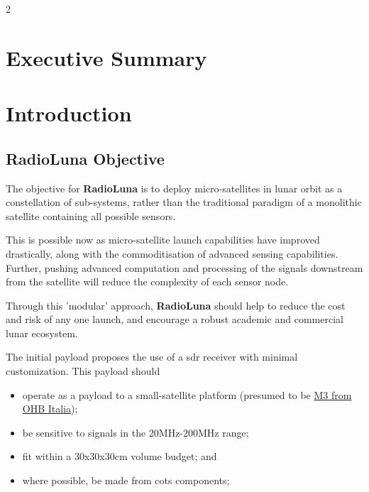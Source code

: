 \documentclass[
	a4paper, %
]{ChaosEngineReport}
\begin{document}
\begin{multicols}{2} %


\tableofcontents %


\section{Executive Summary} %

\lipsum[3]

\newpage

\section {Introduction}
\subsection{RadioLuna Objective}
The objective for \textbf{RadioLuna} is to deploy micro-satellites in lunar orbit as a constellation of sub-systems, rather than the traditional paradigm of a monolithic satellite containing all possible sensors.

This is possible now as micro-satellite launch capabilities have improved drastically, along with the commoditisation of advanced sensing capabilities. Further, pushing advanced computation and processing of the signals downstream from the satellite will reduce the complexity of each sensor node.

Through this 'modular' approach, \textbf{RadioLuna} should help to reduce the cost and risk of any one launch, and encourage a robust academic and commercial lunar ecosystem.

The initial payload proposes the use of a \acrfull{sdr} receiver with minimal customization. This payload should
\begin{itemize}
\item{operate as a payload to a small-satellite platform (presumed to be \href{https://www.ohb-italia.it/satellites-missions/}{M3 from OHB Italia});}
\item{be sensitive to signals in the 20MHz-200MHz range;}
\item{fit within a 30x30x30cm volume budget; and}
\item{where possible, be made from \acrfull{cots} components;}
\end{itemize}


\end{multicols}
\end{document}
